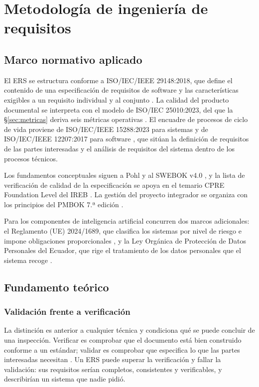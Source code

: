 \section{Metodología de ingeniería de requisitos}
\label{sec:metodologia}

\subsection{Marco normativo aplicado}

El ERS se estructura conforme a ISO/IEC/IEEE 29148:2018, que define el contenido de una
especificación de requisitos de software y las características exigibles a un requisito individual y
al conjunto \cite{iso29148}. La calidad del producto documental se interpreta con el modelo de
ISO/IEC 25010:2023, del que la \S\ref{sec:metricas} deriva seis métricas operativas
\cite{iso25010}. El encuadre de procesos de ciclo de vida proviene de ISO/IEC/IEEE 15288:2023 para
sistemas y de ISO/IEC/IEEE 12207:2017 para software \cite{iso15288, iso12207}, que sitúan la
definición de requisitos de las partes interesadas y el análisis de requisitos del sistema dentro de
los procesos técnicos.

Los fundamentos conceptuales siguen a Pohl \cite{pohl2025} y al SWEBOK v4.0 \cite{swebok4}, y la
lista de verificación de calidad de la especificación se apoya en el temario CPRE Foundation Level
del IREB \cite{ireb31}. La gestión del proyecto integrador se organiza con los principios del PMBOK
7.ª edición \cite{pmbok7}.

Para los componentes de inteligencia artificial concurren dos marcos adicionales: el Reglamento
(UE) 2024/1689, que clasifica los sistemas por nivel de riesgo e impone obligaciones proporcionales
\cite{aiact2024}, y la Ley Orgánica de Protección de Datos Personales del Ecuador, que rige el
tratamiento de los datos personales que el sistema recoge \cite{lopdp2021}.

\subsection{Fundamento teórico}

\subsubsection*{Validación frente a verificación}

La distinción es anterior a cualquier técnica y condiciona qué se puede concluir de una inspección.
Verificar es comprobar que el documento está bien construido conforme a un estándar; validar es
comprobar que especifica lo que las partes interesadas necesitan \cite{pohl2025}. Un ERS puede
superar la verificación y fallar la validación: sus requisitos serían completos, consistentes y
verificables, y describirían un sistema que nadie pidió.

